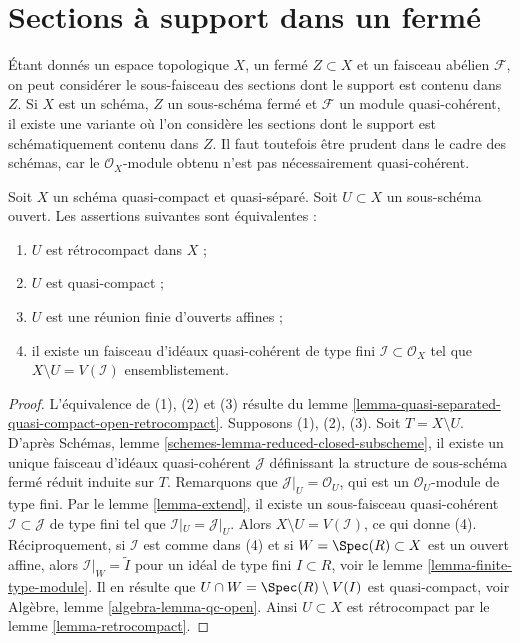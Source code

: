 \section{Sections à support dans un fermé}
\label{section-sections-with-support-in-closed}

\noindent
Étant donnés un espace topologique $X$, un fermé $Z \subset X$ et un
faisceau abélien $\mathcal{F}$, on peut considérer le sous-faisceau des sections dont
le support est contenu dans $Z$. Si $X$ est un schéma, $Z$ un sous-schéma
fermé et $\mathcal{F}$ un module quasi-cohérent, il existe une variante
où l'on considère les sections dont le support est schématiquement
contenu dans $Z$. Il faut toutefois être prudent dans le cadre des schémas, car
le $\mathcal{O}_X$-module obtenu n'est pas nécessairement quasi-cohérent.

\begin{lemma}
\label{lemma-quasi-coherent-finite-type-ideals}
Soit $X$ un schéma quasi-compact et quasi-séparé.
Soit $U \subset X$ un sous-schéma ouvert. Les assertions suivantes sont équivalentes :
\begin{enumerate}
\item $U$ est rétrocompact dans $X$ ;
\item $U$ est quasi-compact ;
\item $U$ est une réunion finie d'ouverts affines ;
\item il existe un faisceau d'idéaux quasi-cohérent de type fini
$\mathcal{I} \subset \mathcal{O}_X$ tel que $X \setminus U = V(\mathcal{I})$
ensemblistement.
\end{enumerate}
\end{lemma}

\begin{proof}
L'équivalence de (1), (2) et (3) résulte du
lemme \ref{lemma-quasi-separated-quasi-compact-open-retrocompact}.
Supposons (1), (2), (3). Soit $T = X \setminus U$. D'après
Schémas, lemme \ref{schemes-lemma-reduced-closed-subscheme}, il existe
un unique faisceau d'idéaux quasi-cohérent $\mathcal{J}$ définissant
la structure de sous-schéma fermé réduit induite sur $T$.
Remarquons que $\mathcal{J}|_U = \mathcal{O}_U$, qui est un
$\mathcal{O}_U$-module de type fini.
Par le lemme \ref{lemma-extend}, il existe un sous-faisceau quasi-cohérent
$\mathcal{I} \subset \mathcal{J}$ de type fini
tel que $\mathcal{I}|_U = \mathcal{J}|_U$.
Alors $X \setminus U = V(\mathcal{I})$, ce qui donne (4). Réciproquement,
si $\mathcal{I}$ est comme dans (4) et si $W = \Spec(R) \subset X$ est un ouvert
affine, alors $\mathcal{I}|_W = \widetilde{I}$ pour un idéal de type fini
$I \subset R$, voir le lemme \ref{lemma-finite-type-module}.
Il en résulte que $U \cap W = \Spec(R) \setminus V(I)$ est quasi-compact,
voir Algèbre, lemme \ref{algebra-lemma-qc-open}. Ainsi $U \subset X$
est rétrocompact par le lemme \ref{lemma-retrocompact}.
\end{proof}

